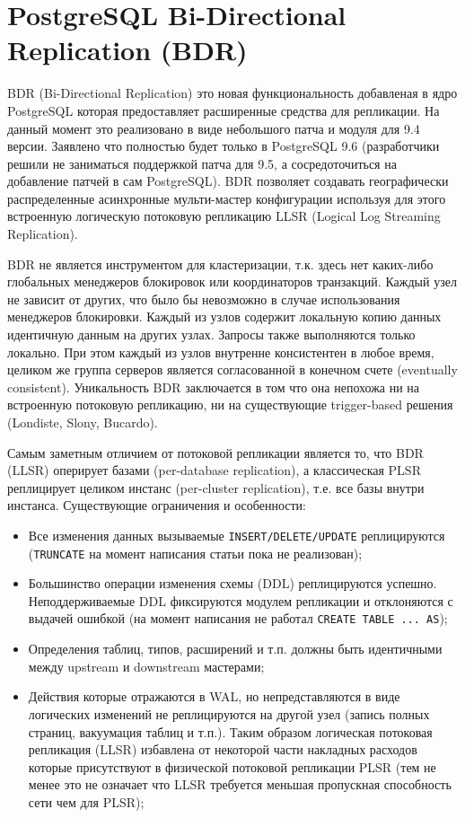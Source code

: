 \section{PostgreSQL Bi-Directional Replication (BDR)}
\label{sec:bdr}

BDR (Bi-Directional Replication) это новая функциональность добавленая в ядро PostgreSQL которая предоставляет расширенные средства для репликации. На данный момент это реализовано в виде небольшого патча и модуля для 9.4 версии. Заявлено что полностью будет только в PostgreSQL 9.6 (разработчики решили не заниматься поддержкой патча для 9.5, а сосредоточиться на добавление патчей в сам PostgreSQL). BDR позволяет создавать географически распределенные асинхронные мульти-мастер конфигурации используя для этого встроенную логическую потоковую репликацию LLSR (Logical Log Streaming Replication).

BDR не является инструментом для кластеризации, т.к. здесь нет каких-либо глобальных менеджеров блокировок или координаторов транзакций. Каждый узел не зависит от других, что было бы невозможно в случае использования менеджеров блокировки. Каждый из узлов содержит локальную копию данных идентичную данным на других узлах. Запросы также выполняются только локально. При этом каждый из узлов внутренне консистентен в любое время, целиком же группа серверов является согласованной в конечном счете (eventually consistent). Уникальность BDR заключается в том что она непохожа ни на встроенную потоковую репликацию, ни на существующие trigger-based решения (Londiste, Slony, Bucardo).

Самым заметным отличием от потоковой репликации является то, что BDR (LLSR) оперирует базами (per-database replication), а классическая PLSR реплицирует целиком инстанс (per-cluster replication), т.е. все базы внутри инстанса. Существующие ограничения и особенности:

\begin{itemize}
  \item Все изменения данных вызываемые \lstinline!INSERT/DELETE/UPDATE! реплицируются (\lstinline!TRUNCATE! на момент написания статьи пока не реализован);
  \item Большинство операции изменения схемы (DDL) реплицируются успешно. Неподдерживаемые DDL фиксируются модулем репликации и отклоняются с выдачей ошибкой (на момент написания не работал \lstinline!CREATE TABLE ... AS!);
  \item Определения таблиц, типов, расширений и т.п. должны быть идентичными между upstream и downstream мастерами;
  \item Действия которые отражаются в WAL, но непредставляются в виде логических изменений не реплицируются на другой узел (запись полных страниц, вакуумация таблиц и т.п.). Таким образом логическая потоковая репликация (LLSR) избавлена от некоторой части накладных расходов которые присутствуют в физической потоковой репликации PLSR (тем не менее это не означает что LLSR требуется меньшая пропускная способность сети чем для PLSR);
\end{itemize}


